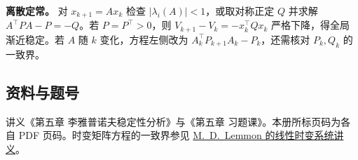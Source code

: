 \documentclass[UTF8,a4paper,11pt,fontset=fandol]{ctexart}
\begin{document}
\textbf{离散定常。} 对 $x_{k+1}=Ax_k$ 检查 $|\lambda_i(A)|<1$，或取对称正定 $Q$ 并求解 $A^\top PA-P=-Q$。若 $P=P^\top>0$，则 $V_{k+1}-V_k=-x_k^\top Qx_k$ 严格下降，得全局渐近稳定。若 $A$ 随 $k$ 变化，方程左侧改为 $A_k^\top P_{k+1}A_k-P_k$，还需核对 $P_k,Q_k$ 的一致界。

\subsection*{资料与题号}
\small
讲义《第五章 李雅普诺夫稳定性分析》与《第五章 习题课》。本册所标页码为各自 PDF 页码。时变矩阵方程的一致界参见 \href{https://www3.nd.edu/~lemmon/courses/EE60550/slide/slide7.pdf}{M.~D.~Lemmon 的线性时变系统讲义}。
\end{document}
